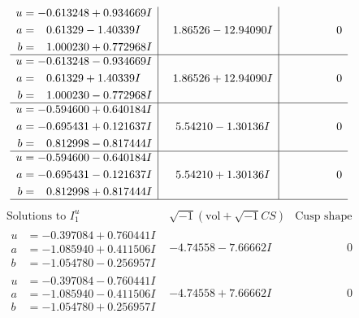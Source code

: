\documentclass[1p]{elsarticle_modified}
\theoremstyle{definition}
\newcommand{\I}{\sqrt{-1}}
\begin{document}
$$\begin{array}{c|c|c}
\begin{aligned}
u &= -0.613248 + 0.934669 I \\
a &= \phantom{-}0.61329 - 1.40339 I \\
b &= \phantom{-}1.000230 + 0.772968 I\end{aligned}
 & \phantom{-}1.86526 - 12.94090 I & \phantom{-0.000000 } 0 \\ \hline\begin{aligned}
u &= -0.613248 - 0.934669 I \\
a &= \phantom{-}0.61329 + 1.40339 I \\
b &= \phantom{-}1.000230 - 0.772968 I\end{aligned}
 & \phantom{-}1.86526 + 12.94090 I & \phantom{-0.000000 } 0 \\ \hline\begin{aligned}
u &= -0.594600 + 0.640184 I \\
a &= -0.695431 + 0.121637 I \\
b &= \phantom{-}0.812998 - 0.817444 I\end{aligned}
 & \phantom{-}5.54210 - 1.30136 I & \phantom{-0.000000 } 0 \\ \hline\begin{aligned}
u &= -0.594600 - 0.640184 I \\
a &= -0.695431 - 0.121637 I \\
b &= \phantom{-}0.812998 + 0.817444 I\end{aligned}
 & \phantom{-}5.54210 + 1.30136 I & \phantom{-0.000000 } 0\\
 \hline 
 \end{array}$$\newpage$$\begin{array}{c|c|c}  
\text{Solutions to }I^u_{1}& \I (\text{vol} + \sqrt{-1}CS) & \text{Cusp shape}\\
 \hline 
\begin{aligned}
u &= -0.397084 + 0.760441 I \\
a &= -1.085940 + 0.411506 I \\
b &= -1.054780 - 0.256957 I\end{aligned}
 & -4.74558 - 7.66662 I & \phantom{-0.000000 } 0 \\ \hline\begin{aligned}
u &= -0.397084 - 0.760441 I \\
a &= -1.085940 - 0.411506 I \\
b &= -1.054780 + 0.256957 I\end{aligned}
 & -4.74558 + 7.66662 I & \phantom{-0.000000 } 0 \\ \hline\begin{aligned}

\end{aligned}
\end{array}$$
\end{document}

